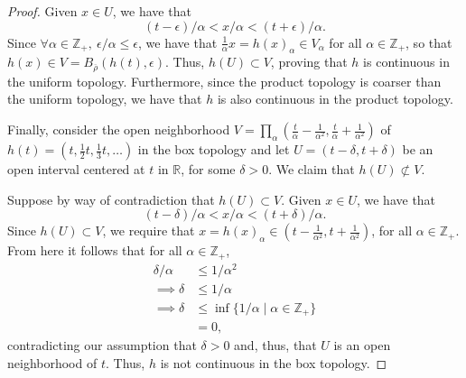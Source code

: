 \documentclass[a4paper,10pt]{article}
\newcommand{\ZZ}{\mathbb{Z}}
\newcommand{\RR}{\mathbb{R}}
\begin{document}
\begin{solution}
\begin{proof}
        Given $x \in U$, we have that
        \begin{equation*}
            (t - \epsilon) / \alpha < x / \alpha < (t + \epsilon) / \alpha.
        \end{equation*}
        Since $\forall \alpha \in \ZZ_+,~ \epsilon / \alpha \leq \epsilon$, we have that $\tfrac{1}{\alpha} x = h(x)_\alpha \in V_\alpha$ for all $\alpha \in \ZZ_+$, so that $h(x) \in V = B_{\overline{\rho}}(h(t), \epsilon)$.
        Thus, $h(U) \subset V$, proving that $h$ is continuous in the uniform topology.
        Furthermore, since the product topology is coarser than the uniform topology, we have that $h$ is also continuous in the product topology.

        Finally, consider the open neighborhood $V = \prod_\alpha (\tfrac{t}{\alpha} - \tfrac{1}{\alpha^2}, \tfrac{t}{\alpha} + \tfrac{1}{\alpha^2})$ of $h(t) = (t, \tfrac{1}{2} t, \tfrac{1}{3} t, \ldots)$ in the box topology and let $U = (t - \delta, t + \delta)$ be an open interval centered at $t$ in $\RR$, for some $\delta > 0$.
        We claim that $h(U) \not\subset V$.

        Suppose by way of contradiction that $h(U) \subset V$.
        Given $x \in U$, we have that
        \begin{equation*}
            (t - \delta) / \alpha < x / \alpha < (t + \delta) / \alpha.
        \end{equation*}
        Since $h(U) \subset V$, we require that $x = h(x)_\alpha \in (t - \tfrac{1}{\alpha^2}, t + \tfrac{1}{\alpha^2})$, for all $\alpha \in \ZZ_+$.
        From here it follows that for all $\alpha \in \ZZ_+$,
        \begin{align*}
            \delta / \alpha &\leq 1 / \alpha^2 \\
            \implies \delta &\leq 1 / \alpha \\
            \implies \delta &\leq \inf\{1 / \alpha \mid \alpha \in \ZZ_+\} \\
                            &= 0,
        \end{align*}
        contradicting our assumption that $\delta > 0$ and, thus, that $U$ is an open neighborhood of $t$.
        Thus, $h$ is not continuous in the box topology.
    \end{proof}
    \bigskip


\end{solution}
\end{document}

